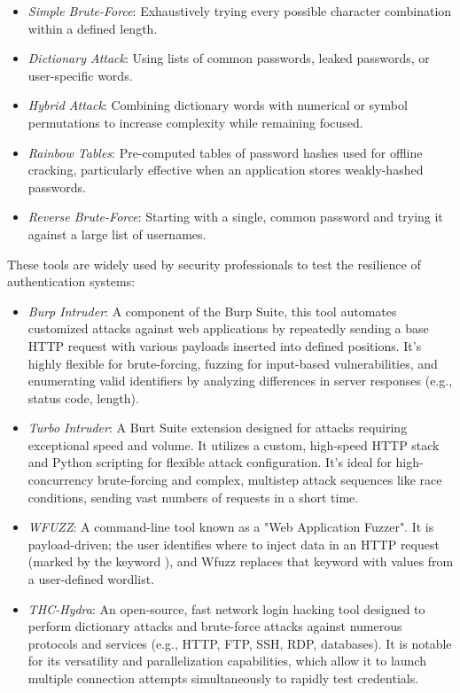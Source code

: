 \begin{itemize}
    \item \textit{Simple Brute-Force}: Exhaustively trying every possible character combination within a defined length.
    \item \textit{Dictionary Attack}: Using lists of common passwords, leaked passwords, or user-specific words.
    \item \textit{Hybrid Attack}: Combining dictionary words with numerical or symbol permutations to increase complexity while remaining focused.
    \item \textit{Rainbow Tables}: Pre-computed tables of password hashes used for offline cracking, particularly effective when an application stores weakly-hashed passwords.
    \item \textit{Reverse Brute-Force}: Starting with a single, common password and trying it against a large list of usernames.
\end{itemize}

These tools are widely used by security professionals to test the resilience of authentication systems:

\begin{itemize}
    \item \textit{Burp Intruder}: A component of the Burp Suite, this tool automates customized attacks against web applications by repeatedly sending a base HTTP request with various payloads inserted into defined positions. It's highly flexible for brute-forcing, fuzzing for input-based vulnerabilities, and enumerating valid identifiers by analyzing differences in server responses (e.g., status code, length).
    \item \textit{Turbo Intruder}: A Burt Suite extension designed for attacks requiring exceptional speed and volume. It utilizes a custom, high-speed HTTP stack and Python scripting for flexible attack configuration. It's ideal for high-concurrency brute-forcing and complex, multistep attack sequences like race conditions, sending vast numbers of requests in a short time.
    \item \textit{WFUZZ}: A command-line tool known as a "Web Application Fuzzer". It is payload-driven; the user identifies where to inject data in an HTTP request (marked by the keyword ), and Wfuzz replaces that keyword with values from a user-defined wordlist.
    \item \textit{THC-Hydra}: An open-source, fast network login hacking tool designed to perform dictionary attacks and brute-force attacks against numerous protocols and services (e.g., HTTP, FTP, SSH, RDP, databases). It is notable for its versatility and parallelization capabilities, which allow it to launch multiple connection attempts simultaneously to rapidly test credentials.
\end{itemize}

